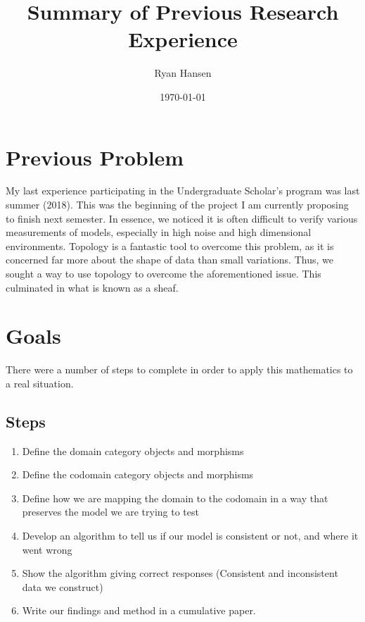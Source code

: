 \documentclass[12pt]{article}
\date{\today}
\author{Ryan Hansen}
\title{Summary of Previous Research Experience}
\begin{document}
	\maketitle
	\section*{Previous Problem}
	My last experience participating in the Undergraduate Scholar's program was last summer (2018). This was the beginning of the project I am currently proposing to finish next semester. In essence, we noticed it is often difficult to verify various measurements of models, especially in high noise and high dimensional environments. Topology is a fantastic tool to overcome this problem, as it is concerned far more about the shape of data than small variations. Thus, we sought a way to use topology to overcome the aforementioned issue. This culminated in what is known as a sheaf. 
	\section*{Goals}
	There were a number of steps to complete in order to apply this mathematics to a real situation. 
	\subsection{Steps}
	\begin{enumerate}
		\item Define the domain category objects and morphisms
		\item Define the codomain category objects and morphisms
		\item Define how we are mapping the domain to the codomain in a way that preserves the model we are trying to test
		\item Develop an algorithm to tell us if our model is consistent or not, and where it went wrong
		\item Show the algorithm giving correct responses (Consistent and inconsistent data we construct)
		\item Write our findings and method in a cumulative paper.
	\end{enumerate}
\end{document}
